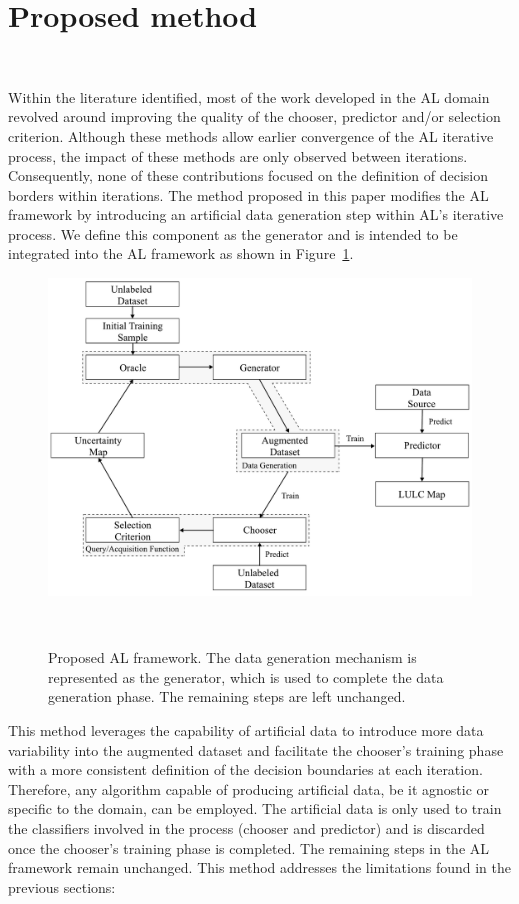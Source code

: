 \documentclass[parskip=full]{scrartcl}
\begin{document}
\section{Proposed method}~\label{sec:proposed-method}

Within the literature identified, most of the work developed in the AL domain
revolved around improving the quality of the chooser, predictor and/or
selection criterion. Although these methods allow earlier convergence of the AL
iterative process, the impact of these methods are only observed between
iterations. Consequently, none of these contributions focused on the
definition of decision borders within iterations. The method proposed in this
paper modifies the AL framework by introducing an artificial data generation
step within AL's iterative process. We define this component as the generator
and is intended to be integrated into the AL framework as shown in
Figure~\ref{fig:al_new}. 

\begin{figure}[htb]
	\centering
	\includegraphics[width=.85\linewidth]{../analysis/al_new}
    \caption{Proposed AL framework. The data generation mechanism is
        represented as the generator, which is used to complete the data
        generation phase. The remaining steps are left unchanged.
    }~\label{fig:al_new}
\end{figure}

This method leverages the capability of artificial data to introduce more data
variability into the augmented dataset and facilitate the chooser's training
phase with a more consistent definition of the decision boundaries at each
iteration. Therefore, any algorithm capable of producing artificial data, be
it agnostic or specific to the domain, can be employed. The artificial data is
only used to train the classifiers involved in the process (chooser and
predictor) and is discarded once the chooser's training phase is completed.
The remaining steps in the AL framework remain unchanged. This method
addresses the limitations found in the previous sections: 
\end{document}
